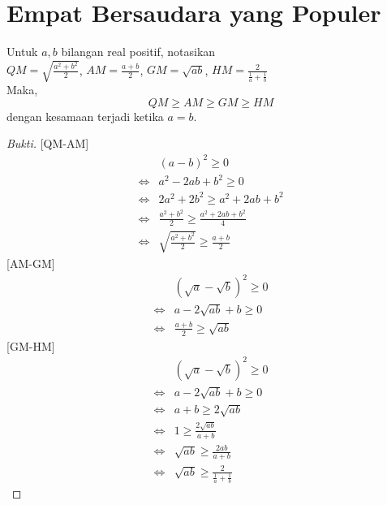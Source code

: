 \documentclass[11pt]{scrartcl}
\begin{document}
\section{Empat Bersaudara yang Populer}
\begin{theorem}
Untuk $a,b$ bilangan real positif, notasikan \\ 
$QM = \sqrt{\frac{a^2 + b^2}{2}}$, $AM = \frac{a + b}{2}$, $GM = \sqrt{ab}$, $HM = \frac{2}{\frac{1}{a} + \frac{1}{b}}$\\
Maka, $$QM \geq AM \geq GM \geq HM$$ dengan kesamaan terjadi ketika $a = b$.
\end{theorem}
\begin{proof}[Bukti]
[QM-AM] 
    \begin{equation*} 
        \begin{split}
            & (a-b)^2 \geq 0\\
            \iff & a^2 - 2ab + b^2 \geq 0\\
            \iff & 2a^2 + 2b^2 \geq a^2 + 2ab + b^2\\
            \iff & \frac{a^2 + b^2}{2} \geq \frac{a^2 + 2ab + b^2}{4}\\
            \iff & \sqrt{\frac{a^2 + b^2}{2}} \geq \frac{a + b}{2} 
        \end{split}
    \end{equation*}
[AM-GM]
    \begin{equation*}
        \begin{split}
            & (\sqrt{a}-\sqrt{b})^2 \geq 0\\
            \iff & a - 2\sqrt{ab} + b \geq 0\\
            \iff & \frac{a + b}{2} \geq \sqrt{ab} 
        \end{split}
    \end{equation*}
[GM-HM]
    \begin{equation*}
        \begin{split}
            & (\sqrt{a} - \sqrt{b})^2 \geq 0\\
            \iff & a - 2\sqrt{ab} + b \geq 0\\
            \iff & a + b \geq 2\sqrt{ab}\\
            \iff & 1 \geq \frac{2\sqrt{ab}}{a+b}\\
            \iff & \sqrt{ab} \geq \frac{2ab}{a+b}\\
            \iff & \sqrt{ab} \geq \frac{2}{\frac{1}{a} + \frac{1}{b}} 
        \end{split}
    \end{equation*}
\end{proof}
\end{document}
